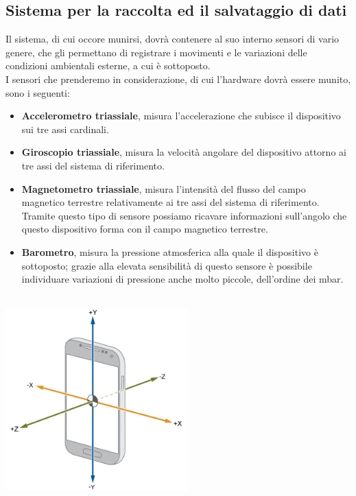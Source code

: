 \documentclass[a4paper]{article}
\begin{document}
	\subsection{Sistema per la raccolta ed il salvataggio di dati}


Il sistema, di cui occore munirsi, dovrà contenere al suo interno sensori di vario genere, che gli permettano di registrare i movimenti e le variazioni delle condizioni ambientali esterne, a cui è sottoposto. \\
I sensori che prenderemo in considerazione, di cui l'hardware dovrà essere munito, sono i seguenti:
\begin{itemize}
\item \textbf{Accelerometro triassiale}, misura l’accelerazione che subisce il dispositivo sui tre assi cardinali.
\item \textbf{Giroscopio triassiale}, misura la velocità angolare del dispositivo attorno ai tre assi del sistema di riferimento.
\item \textbf{Magnetometro triassiale}, misura l’intensità del flusso del campo magnetico terrestre relativamente ai tre assi del sistema di riferimento. Tramite questo tipo di sensore possiamo ricavare informazioni sull’angolo che questo dispositivo forma con il campo magnetico terrestre.
\item \textbf{Barometro}, misura la pressione atmosferica alla quale il dispositivo è sottoposto; grazie alla elevata sensibilità di questo sensore è possibile individuare variazioni di pressione anche molto piccole, dell’ordine dei mbar.\\ \\
\end{itemize}

\begin{center}
\begin{minipage}{0.48\linewidth}
\includegraphics[width=70mm]{./images/triaxial_sensor.png}
\makebox[\linewidth]{}
\end{minipage}
\end{center}
\end{document}
